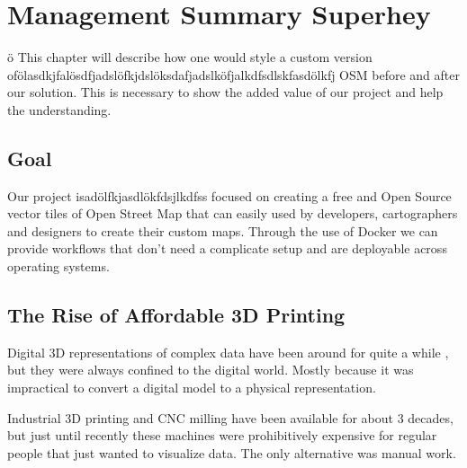 
\chapter{Management Summary Superhey}

\label{ch:motivation} %


ö
This chapter will describe how one would style a custom version ofölasdkjfalösdfjadslöfkjdslöksdafjadslköfjalkdfsdlskfasdölkfj OSM before and after our solution. This is necessary to show the added value of our project and help the understanding.


\section{Goal}\label{sec:datavis}

Our project isadölfkjasdlökfdsjlkdfss focused on creating a free and Open Source vector tiles of Open Street Map that can easily used by developers, cartographers and designers to create their custom maps.
Through the use of Docker we can provide workflows that don’t need a complicate setup and are deployable across operating systems.


\section{The Rise of Affordable 3D Printing}\label{sec:history-3dprinting}

Digital 3D representations of complex data have been around for quite a while
\cite{marcus:2003}, but they were always confined to the digital world.  Mostly
because it was impractical to convert a digital model to a physical
representation.

Industrial 3D printing and CNC milling have been available for about 3 decades,
but just until recently these machines were prohibitively expensive for regular
people that just wanted to visualize data. The only alternative was manual work.


